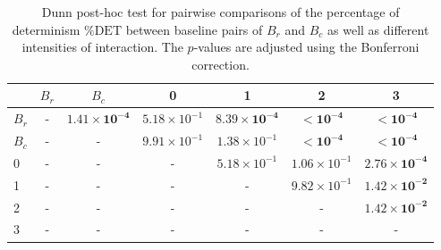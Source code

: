 \begin{table}
\centering
\caption{Dunn post-hoc test for pairwise comparisons of the percentage of determinism $\%\text{DET}$ between baseline pairs of $B_r$ and $B_c$ as well as different intensities of interaction. The $p$-values are adjusted using the Bonferroni correction.}
\label{tab:dunn_det}
\begin{tabular}{lcccccc}
\toprule
 & $B_r$ & $B_c$ & 0 & 1 & 2 & 3 \\
\midrule
$B_r$ & - & $\mathbf{1.41 \times 10^{-4}}$ & $5.18 \times 10^{-1}$ & $\mathbf{8.39 \times 10^{-4}}$ & $\mathbf{< 10^{-4}}$ & $\mathbf{< 10^{-4}}$ \\
$B_c$ & - & - & $9.91 \times 10^{-1}$ & $1.38 \times 10^{-1}$ & $\mathbf{< 10^{-4}}$ & $\mathbf{< 10^{-4}}$ \\
0 & - & - & - & $5.18 \times 10^{-1}$ & $1.06 \times 10^{-1}$ & $\mathbf{2.76 \times 10^{-4}}$ \\
1 & - & - & - & - & $9.82 \times 10^{-1}$ & $\mathbf{1.42 \times 10^{-2}}$ \\
2 & - & - & - & - & - & $\mathbf{1.42 \times 10^{-2}}$ \\
3 & - & - & - & - & - & - \\
\bottomrule
\end{tabular}
\end{table}
